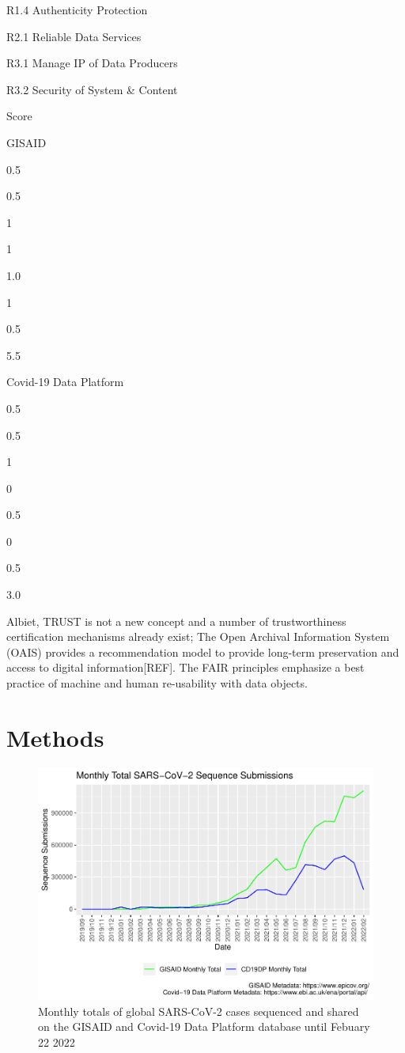 \documentclass{article}
\begin{document}
R1.4 Authenticity Protection

R2.1 Reliable Data Services

R3.1 Manage IP of Data Producers

R3.2 Security of System \& Content

Score

{GISAID }

{0.5}

{0.5}

{1}

{1}

{1.0}

{1}

{0.5}

{5.5}

{Covid-19 Data Platform}

{0.5}

{0.5}

{1}

{0}

{0.5}

{0}

{0.5}

{3.0}

Albiet, TRUST is not a new concept and a number of trustworthiness
certification mechanisms already exist; The Open Archival Information
System (OAIS) provides a recommendation model to provide long-term
preservation and access to digital information{[}REF{]}. The FAIR
principles emphasize a best practice of machine and human re-usability
with data objects.

\hypertarget{methods}{%
\section{Methods}\label{methods}}

\begin{figure}
\centering
\includegraphics{Report_files/figure-latex/fig2-1.pdf}
\caption{Monthly totals of global SARS-CoV-2 cases sequenced and shared
on the GISAID and Covid-19 Data Platform database until Febuary 22 2022}
\end{figure}



\end{document}
